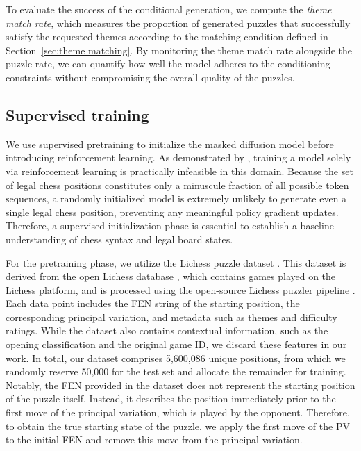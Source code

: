 To evaluate the success of the conditional generation, we compute the \textit{theme match rate}, which measures the proportion of generated puzzles that successfully satisfy the requested themes according to the matching condition defined in Section~\ref{sec:theme matching}. By monitoring the theme match rate alongside the puzzle rate, we can quantify how well the model adheres to the conditioning constraints without compromising the overall quality of the puzzles.


\subsection{Supervised training}
\label{sec:supervised training}

We use supervised pretraining to initialize the masked diffusion model before introducing reinforcement learning. As demonstrated by \citeauthor{feng2025generatingcreativechesspuzzles} \cite{feng2025generatingcreativechesspuzzles}, training a model solely via reinforcement learning is practically infeasible in this domain. Because the set of legal chess positions constitutes only a minuscule fraction of all possible token sequences, a randomly initialized model is extremely unlikely to generate even a single legal chess position, preventing any meaningful policy gradient updates. Therefore, a supervised initialization phase is essential to establish a baseline understanding of chess syntax and legal board states.

For the pretraining phase, we utilize the Lichess puzzle dataset \cite{lichesspuzzledatabase}. This dataset is derived from the open Lichess database \cite{lichessopendatabase}, which contains games played on the Lichess platform, and is processed using the open-source Lichess puzzler pipeline \cite{lichesspuzzler}. Each data point includes the FEN string of the starting position, the corresponding principal variation, and metadata such as themes and difficulty ratings. While the dataset also contains contextual information, such as the opening classification and the original game ID, we discard these features in our work. In total, our dataset comprises 5,600,086 unique positions, from which we randomly reserve 50,000 for the test set and allocate the remainder for training. Notably, the FEN provided in the dataset does not represent the starting position of the puzzle itself. Instead, it describes the position immediately prior to the first move of the principal variation, which is played by the opponent. Therefore, to obtain the true starting state of the puzzle, we apply the first move of the PV to the initial FEN and remove this move from the principal variation.

